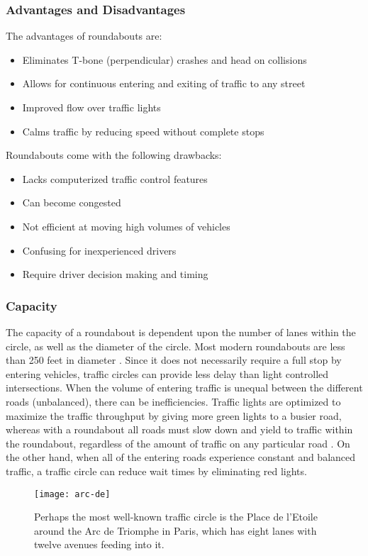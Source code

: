 \subsubsection{Advantages and Disadvantages}
The advantages of roundabouts are:\begin{itemize}
	\item Eliminates T-bone (perpendicular) crashes and head on collisions
	\item Allows for continuous entering and exiting of traffic to any street
	\item Improved flow over traffic lights
	\item Calms traffic by reducing speed without complete stops
\end{itemize}

Roundabouts come with the following drawbacks:\begin{itemize}
	\item Lacks computerized traffic control features
	\item Can become congested
	\item Not efficient at moving high volumes of vehicles
	\item Confusing for inexperienced drivers
	\item Require driver decision making and timing
\end{itemize}

\subsubsection{Capacity}
The capacity of a roundabout is dependent upon the number of lanes within the circle, as well as the diameter of the circle.  Most modern roundabouts are less than 250 feet in diameter \cite{rabout1}.  Since it does not necessarily require a full stop by entering vehicles, traffic circles can provide less delay than light controlled intersections.  When the volume of entering traffic is unequal between the different roads (unbalanced), there can be inefficiencies.  Traffic lights are optimized to maximize the traffic throughput by giving more green lights to a busier road, whereas with a roundabout all roads must slow down and yield to traffic within the roundabout, regardless of the amount of traffic on any particular road \cite{rabout4}.  On the other hand, when all of the entering roads experience constant and balanced traffic, a traffic circle can reduce wait times by eliminating red lights.  

\begin{figure}[!htbp]
\centering
\texttt{[image: arc-de]}
\caption[Place de l’Etoile]{Perhaps the most well-known traffic circle is the Place de l’Etoile around the Arc de Triomphe in Paris, which has eight lanes with twelve avenues feeding into it.}\label{fig:arc-de}
\end{figure}

